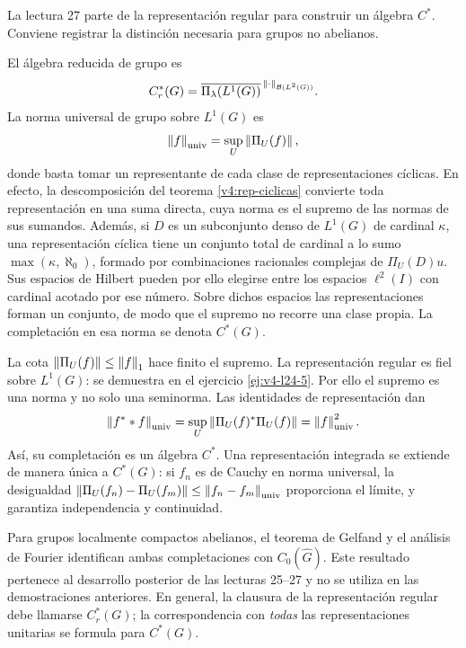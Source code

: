 La lectura 27 parte de la representación regular para construir un álgebra $C^*$. Conviene registrar la distinción necesaria para grupos no abelianos.

\begin{definicion}\label{v4-l24-d:cstar}
El álgebra reducida de grupo es
\[
C_r^*(G)=\overline{\Pi_\lambda(L^1(G))}^{\,\left\lVert\cdot\right\rVert_{\mathcal B(L^2(G))}}.
\]
La norma universal de grupo sobre $L^1(G)$ es
\[
\left\lVert f\right\rVert_{\mathrm{univ}}=\sup_U\left\lVert\Pi_U(f)\right\rVert,
\]
donde basta tomar un representante de cada clase de representaciones cíclicas. En efecto, la descomposición del teorema \ref{v4:rep-ciclicas} convierte toda representación en una suma directa, cuya norma es el supremo de las normas de sus sumandos. Además, si $D$ es un subconjunto denso de $L^1(G)$ de cardinal $\kappa$, una representación cíclica tiene un conjunto total de cardinal a lo sumo $\max(\kappa,\aleph_0)$, formado por combinaciones racionales complejas de $\Pi_U(D)u$. Sus espacios de Hilbert pueden por ello elegirse entre los espacios $\ell^2(I)$ con cardinal acotado por ese número. Sobre dichos espacios las representaciones forman un conjunto, de modo que el supremo no recorre una clase propia. La completación en esa norma se denota $C^*(G)$.
\end{definicion}

\begin{observacion}
La cota $\left\lVert\Pi_U(f)\right\rVert\leq\left\lVert f\right\rVert_1$ hace finito el supremo. La representación regular es fiel sobre $L^1(G)$: se demuestra en el ejercicio \ref{ej:v4-l24-5}. Por ello el supremo es una norma y no solo una seminorma. Las identidades de representación dan
\[
\left\lVert f^**f\right\rVert_{\mathrm{univ}}
=\sup_U\left\lVert\Pi_U(f)^*\Pi_U(f)\right\rVert
=\left\lVert f\right\rVert_{\mathrm{univ}}^2.
\]
Así, su completación es un álgebra $C^*$. Una representación integrada se extiende de manera única a $C^*(G)$: si $f_n$ es de Cauchy en norma universal, la desigualdad $\left\lVert\Pi_U(f_n)-\Pi_U(f_m)\right\rVert\leq\left\lVert f_n-f_m\right\rVert_{\mathrm{univ}}$ proporciona el límite, y garantiza independencia y continuidad.

Para grupos localmente compactos abelianos, el teorema de Gelfand y el análisis de Fourier identifican ambas completaciones con $C_0(\widehat G)$. Este resultado pertenece al desarrollo posterior de las lecturas 25--27 y no se utiliza en las demostraciones anteriores. En general, la clausura de la representación regular debe llamarse $C_r^*(G)$; la correspondencia con \emph{todas} las representaciones unitarias se formula para $C^*(G)$.
\end{observacion}

